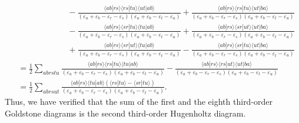 \documentclass[a4paper]{book}
\newcounter{solution}[chapter]
\begin{document}
\begin{solution}
\begin{align*}
		&\hspace{6em} - \frac{ \langle ab | rs \rangle \langle rs | tu \rangle \langle ut | ab \rangle }{ ( \varepsilon_a + \varepsilon_b - \varepsilon_r - \varepsilon_s ) ( \varepsilon_a + \varepsilon_b - \varepsilon_t - \varepsilon_u ) } + \frac{ \langle ab | rs \rangle \langle rs | tu \rangle \langle ut | ba \rangle }{ ( \varepsilon_a + \varepsilon_b - \varepsilon_r - \varepsilon_s ) ( \varepsilon_a + \varepsilon_b - \varepsilon_t - \varepsilon_u ) } \\
		&\hspace{6em} - \frac{ \langle ab | rs \rangle \langle sr | tu \rangle \langle tu | ab \rangle }{ ( \varepsilon_a + \varepsilon_b - \varepsilon_r - \varepsilon_s ) ( \varepsilon_a + \varepsilon_b - \varepsilon_t - \varepsilon_u ) } + \frac{ \langle ab | rs \rangle \langle sr | ut \rangle \langle ut | ba \rangle }{ ( \varepsilon_a + \varepsilon_b - \varepsilon_r - \varepsilon_s ) ( \varepsilon_a + \varepsilon_b - \varepsilon_t - \varepsilon_u ) } \\
		&\hspace{6em} + \frac{ \langle ab | rs \rangle \langle sr | ut \rangle \langle tu | ab \rangle }{ ( \varepsilon_a + \varepsilon_b - \varepsilon_r - \varepsilon_s ) ( \varepsilon_a + \varepsilon_b - \varepsilon_t - \varepsilon_u ) } - \frac{ \langle ab | rs \rangle \langle sr | tu \rangle \langle ut | ba \rangle }{ ( \varepsilon_a + \varepsilon_b - \varepsilon_r - \varepsilon_s ) ( \varepsilon_a + \varepsilon_b - \varepsilon_t - \varepsilon_u ) } \\
		&= \frac{1}{2} \sum_{abrstu} \frac{ \langle ab | rs \rangle \langle rs | tu \rangle \langle tu | ab \rangle }{ ( \varepsilon_a + \varepsilon_b - \varepsilon_r - \varepsilon_s ) ( \varepsilon_a + \varepsilon_b - \varepsilon_t - \varepsilon_u ) } - \frac{ \langle ab | rs \rangle \langle rs | ut \rangle \langle ut | ba \rangle }{ ( \varepsilon_a + \varepsilon_b - \varepsilon_r - \varepsilon_s ) ( \varepsilon_a + \varepsilon_b - \varepsilon_t - \varepsilon_u ) } \\
		&= \frac{1}{2} \sum_{abrsut} \frac{ \langle ab | rs \rangle \langle tu | ab \rangle ( \langle rs | tu \rangle - \langle sr | tu \rangle ) }{ ( \varepsilon_a + \varepsilon_b - \varepsilon_r - \varepsilon_s ) ( \varepsilon_a + \varepsilon_b - \varepsilon_t - \varepsilon_u ) }.
	\end{align*}
	Thus, we have verified that the sum of the first and the eighth third-order Goldstone diagrams is the second third-order Hugenholtz diagram.
	

\end{solution}
\end{document}

